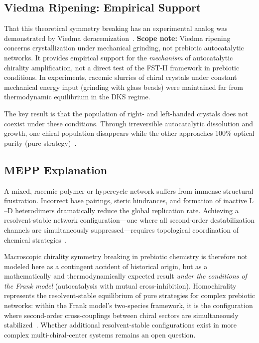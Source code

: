 \documentclass[12pt,a4paper]{article}
\theoremstyle{remark}
\begin{document}
\subsection{Viedma Ripening: Empirical Support}

That this theoretical symmetry breaking has an experimental analog was demonstrated by Viedma deracemization~\citep{HomochiralityThermo}. \textbf{Scope note:} Viedma ripening concerns crystallization under mechanical grinding, not prebiotic autocatalytic networks. It provides empirical support for the \emph{mechanism} of autocatalytic chirality amplification, not a direct test of the FST-II framework in prebiotic conditions. In experiments, racemic slurries of chiral crystals under constant mechanical energy input (grinding with glass beads) were maintained far from thermodynamic equilibrium in the DKS regime.

The key result is that the population of right- and left-handed crystals does not coexist under these conditions. Through irreversible autocatalytic dissolution and growth, one chiral population disappears while the other approaches 100\% optical purity (pure strategy)~\citep{HomochiralityThermo}.

\subsection{MEPP Explanation}

A mixed, racemic polymer or hypercycle network suffers from immense structural frustration. Incorrect base pairings, steric hindrances, and formation of inactive $\mathrm{L}$--$\mathrm{D}$ heterodimers dramatically reduce the global replication rate. Achieving a resolvent-stable network configuration---one where all second-order destabilization channels are simultaneously suppressed---requires topological coordination of chemical strategies~\citep{Biochirality}.

Macroscopic chirality symmetry breaking in prebiotic chemistry is therefore not modeled here as a contingent accident of historical origin, but as a mathematically and thermodynamically expected result \emph{under the conditions of the Frank model} (autocatalysis with mutual cross-inhibition). Homochirality represents the resolvent-stable equilibrium of pure strategies for complex prebiotic networks: within the Frank model's two-species framework, it is the configuration where second-order cross-couplings between chiral sectors are simultaneously stabilized~\citep{Biochirality}. Whether additional resolvent-stable configurations exist in more complex multi-chiral-center systems remains an open question.
\end{document}
